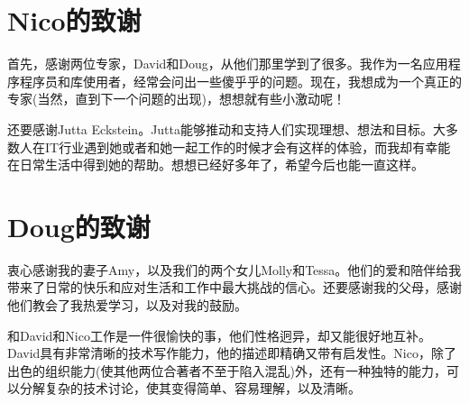 \section{Nico的致谢}

首先，感谢两位专家，David和Doug，从他们那里学到了很多。我作为一名应用程序程序员和库使用者，经常会问出一些傻乎乎的问题。现在，我想成为一个真正的专家(当然，直到下一个问题的出现)，想想就有些小激动呢！

还要感谢Jutta Eckstein。Jutta能够推动和支持人们实现理想、想法和目标。大多数人在IT行业遇到她或者和她一起工作的时候才会有这样的体验，而我却有幸能在日常生活中得到她的帮助。想想已经好多年了，希望今后也能一直这样。

\section{Doug的致谢}

衷心感谢我的妻子Amy，以及我们的两个女儿Molly和Tessa。他们的爱和陪伴给我带来了日常的快乐和应对生活和工作中最大挑战的信心。还要感谢我的父母，感谢他们教会了我热爱学习，以及对我的鼓励。

和David和Nico工作是一件很愉快的事，他们性格迥异，却又能很好地互补。David具有非常清晰的技术写作能力，他的描述即精确又带有启发性。Nico，除了出色的组织能力(使其他两位合著者不至于陷入混乱)外，还有一种独特的能力，可以分解复杂的技术讨论，使其变得简单、容易理解，以及清晰。


